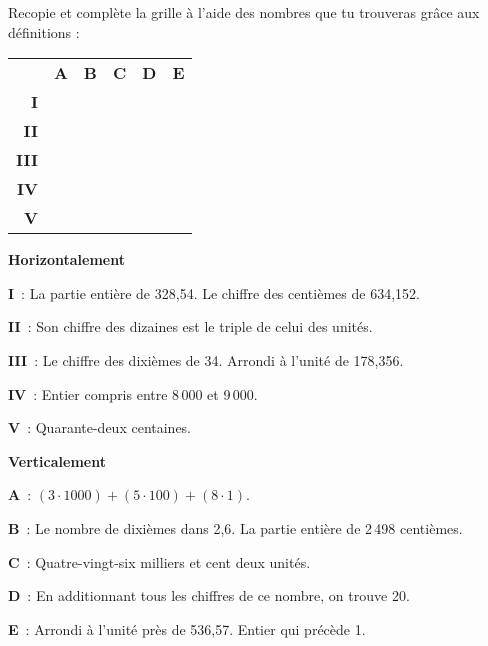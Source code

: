 \begin{exercice}
Recopie et complète la grille à l'aide des nombres que tu trouveras grâce aux définitions :

\begin{center}
\begin{tabularx}{.5\linewidth}{r|c|c|c|c|c|}
\multicolumn{1}{c}{}& \multicolumn{1}{c}{\textbf{A}} & \multicolumn{1}{c}{\textbf{B}} & \multicolumn{1}{c}{\textbf{C}} & \multicolumn{1}{c}{\textbf{D}} & \multicolumn{1}{c}{\textbf{E}} \\ \cline{2-6}
\textbf{I} & & & & \cellcolor{black} & \\ \cline{2-6} 
\textbf{II} & & & & & \\ \cline{2-6} 
\textbf{III} & & \cellcolor{black} & & & \\ \cline{2-6} 
\textbf{IV} & & & & & \cellcolor{black} \\ \cline{2-6} 
\textbf{V} & \cellcolor{black} & & & & \\ \cline{2-6} 
\end{tabularx}
\end{center}

\vspace{0.75em}

\textbf{Horizontalement}

\textbf{I} : La partie entière de 328,54. Le chiffre des centièmes de 634,152.

\textbf{II} : Son chiffre des dizaines est le triple de celui des unités.

\textbf{III} : Le chiffre des dixièmes de 34. Arrondi à l'unité de 178,356.

\textbf{IV} : Entier compris entre 8\,000 et 9\,000.

\textbf{V} : Quarante-deux centaines.

\vspace{0.75em}

\textbf{Verticalement}

\textbf{A} : $(3 \cdot 1 000) + (5 \cdot 100) + (8 \cdot 1)$.

\textbf{B} : Le nombre de dixièmes dans 2,6. La partie entière de 2\,498 centièmes.

\textbf{C} : Quatre-vingt-six milliers et cent deux unités.

\textbf{D} : En additionnant tous les chiffres de ce nombre, on trouve 20.

\textbf{E} : Arrondi à l'unité près de 536,57. Entier qui précède 1.

\end{exercice}


